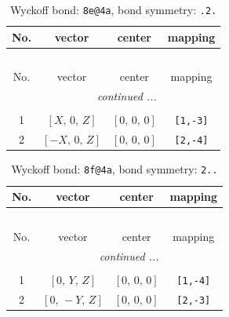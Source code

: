 \documentclass[fleqn,8pt]{jsarticle}
\begin{document}
\begin{longtable}{cccc}
\caption{Wyckoff bond: {\tt 8e@4a}, bond symmetry: {\tt .2.}}
 \\
 \hline \hline
No. & vector & center & mapping \\ \hline \endfirsthead

\multicolumn{3}{l}{\tablename\ \thetable{}} \\
 \hline \hline
No. & vector & center & mapping \\ \hline \endhead

 \hline \hline
\multicolumn{3}{r}{\footnotesize\it continued ...} \\ \endfoot

 \hline \hline
\multicolumn{3}{r}{} \\ \endlastfoot

1 & $\left[ X,\, 0,\, Z \right]$ & $\left[ 0,\, 0,\, 0 \right]$ & {\tt [1,-3]} \\ \hline
2 & $\left[ - X,\, 0,\, Z \right]$ & $\left[ 0,\, 0,\, 0 \right]$ & {\tt [2,-4]} \\
\end{longtable}
\renewcommand{\arraystretch}{1.2}
\begin{longtable}{cccc}
\caption{Wyckoff bond: {\tt 8f@4a}, bond symmetry: {\tt 2..}}
 \\
 \hline \hline
No. & vector & center & mapping \\ \hline \endfirsthead

\multicolumn{3}{l}{\tablename\ \thetable{}} \\
 \hline \hline
No. & vector & center & mapping \\ \hline \endhead

 \hline \hline
\multicolumn{3}{r}{\footnotesize\it continued ...} \\ \endfoot

 \hline \hline
\multicolumn{3}{r}{} \\ \endlastfoot

1 & $\left[ 0,\, Y,\, Z \right]$ & $\left[ 0,\, 0,\, 0 \right]$ & {\tt [1,-4]} \\ \hline
2 & $\left[ 0,\, - Y,\, Z \right]$ & $\left[ 0,\, 0,\, 0 \right]$ & {\tt [2,-3]} \\
\end{longtable}
\renewcommand{\arraystretch}{1.2}
\end{document}
